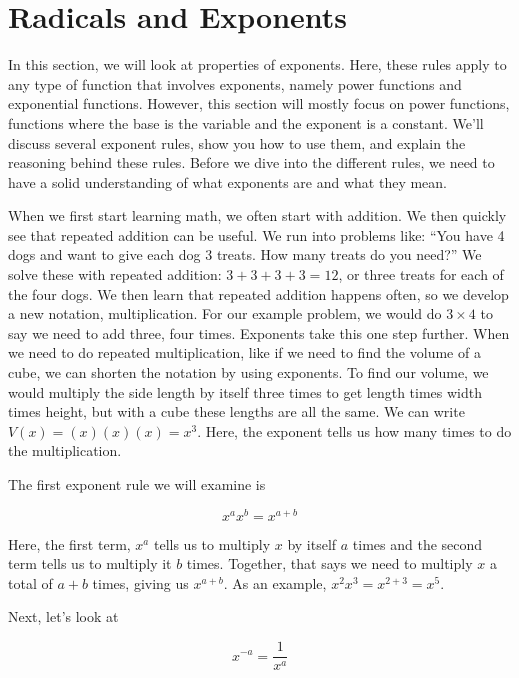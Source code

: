 \section{Radicals and Exponents}\label{sec:exponents}

In this section, we will look at properties of exponents. Here, these rules apply to any type of function that involves exponents, namely power functions and exponential functions. However, this section will mostly focus on power functions, functions where the base is the variable and the exponent is a constant. We'll discuss several exponent rules, show you how to use them, and explain the reasoning behind these rules. Before we dive into the different rules, we need to have a solid understanding of what exponents are and what they mean.

When we first start learning math, we often start with addition. We then quickly see that repeated addition can be useful. We run into problems like: ``You have 4 dogs and want to give each dog 3 treats. How many treats do you need?'' We solve these with repeated addition: $3+3+3+3 = 12$, or three treats for each of the four dogs. We then learn that repeated addition happens often, so we develop a new notation, multiplication. For our example problem, we would do $3 \times 4$ to say we need to add three, four times. Exponents take this one step further. When we need to do repeated multiplication, like if we need to find the volume of a cube, we can shorten the notation by using exponents. To find our volume, we would multiply the side length by itself three times to get length times width times height, but with a cube these lengths are all the same. We can write $V(x) = (x)(x)(x)=x^3$. Here, the exponent tells us how many times to do the multiplication.

The first exponent rule we will examine is

\begin{equation}\label{eqn:add_exponents}
	x^ax^b=x^{a+b}
\end{equation}

\noindent Here, the first term, $x^a$ tells us to multiply $x$ by itself $a$ times and the second term tells us to multiply it $b$ times. Together, that says we need to multiply $x$ a total of $a+b$ times, giving us $x^{a+b}$. As an example, $x^2x^3 = x^{2+3} = x^5$.

Next, let's look at

\begin{equation}
	x^{-a} = \frac{1}{x^a}
\end{equation}

